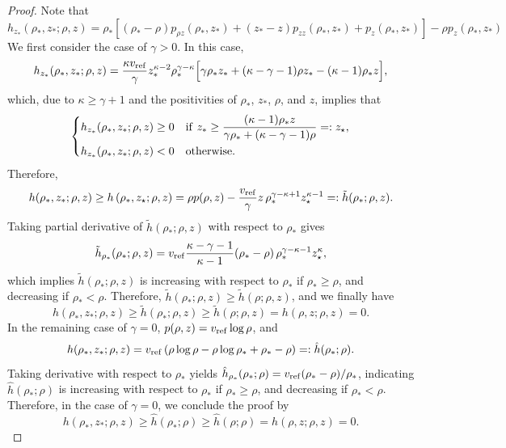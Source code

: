 \documentclass[times,final]{elsarticle}
\numberwithin{equation}{section}
\theoremstyle{definition}
\theoremstyle{remark}
\newcommand{\rz}{z_\star}
\begin{document}
\begin{proof}
	Note that
	\[
	h_{z_*}(\rho_*, z_*;\rho,z)
	= 
	\rho_*\left[
	\left(\rho_*-\rho\right) p_{\rho z}(\rho_*, z_*)
	+
	(z_*-z) p_{zz}(\rho_*, z_*)
	+
	p_z(\rho_*, z_*)
	\right]
	-\rho p_z(\rho_*, z_*) 
	\]
	We first consider the case of $\gamma > 0$. In this case,
	\[
	h_{z_*}(\rho_*, z_*;\rho,z)
	= 
	\frac{\kappa v_{\rm ref}}{\gamma} z_*^{\kappa-2} \rho_*^{\gamma-\kappa}
	\Big[
	\gamma \rho_*z_*
	+
	(\kappa-\gamma-1) \rho z_*
	-
	(\kappa-1) \rho_* z
	\Big],
	\]
	which, due to $\kappa \ge \gamma+1$ and the positivities of $\rho_*$, $z_*$, $\rho$, and $z$, implies that
	\[
	\begin{dcases}
		h_{z_*}(\rho_*, z_*;\rho,z) \ge 0
		&
		{\rm if} ~  z_* \ge \frac{(\kappa-1) \rho_* z}{\gamma \rho_* + (\kappa-\gamma-1) \rho} =: \rz,
		\\
		h_{z_*}(\rho_*, z_*;\rho,z) < 0
		&
		{\rm otherwise}.
	\end{dcases}
	\]
	Therefore,
	\begin{align*}
		h(\rho_*, z_*;\rho,z)
		\ge 
		h\left(\rho_*, \rz;\rho,z\right)
		= \rho p (\rho, z) - \frac{v_{\rm ref}}{\gamma} z \, \rho_*^{\gamma - \kappa + 1} \rz^{\kappa - 1}
		=:	\tilde{h}(\rho_*;\rho,z).
	\end{align*}
	Taking partial derivative of $\tilde{h}(\rho_*;\rho,z)$ with respect to $\rho_*$ gives
	\[
	\tilde h_{\rho_*}(\rho_*;\rho,z)
	=
	v_{\rm ref} \frac{\kappa - \gamma - 1}{\kappa - 1} 
	(\rho_* -\rho) \, \rho_* ^{\gamma -\kappa -1} \rz^\kappa,
	\]
	which implies $\tilde h(\rho_*;\rho,z)$ is increasing with respect to $\rho_*$ if $\rho_* \ge \rho$, and decreasing if $\rho_* < \rho$.
	Therefore, $\tilde h(\rho_*;\rho,z)	\ge \tilde h(\rho;\rho,z)$, and we finally have
	\[
	h(\rho_*,z_*;\rho,z) 
	\ge \tilde h(\rho_*;\rho,z)
	\ge \tilde h(\rho;\rho,z)
	=
	h(\rho,z;\rho,z) = 0.
	\]
	In the remaining case of $\gamma = 0$, $p(\rho,z) = v_{\rm ref} \log \rho$, and
	\[
	h(\rho_*,z_*;\rho,z)
	=
	v_{\rm ref} \left(
	\rho \log \rho - \rho \log \rho_* + \rho_* - \rho
	\right)
	=: \hat{h}(\rho_*;\rho).
	\]
	Taking derivative with respect to $\rho_*$ yields
	$\hat{h}_{\rho_*}(\rho_*;\rho)=v_{\rm ref}(\rho_*-\rho)/\rho_*$, indicating $\hat{h}(\rho_*;\rho)$ is increasing with respect to $\rho_*$ if $\rho_* \ge \rho$, and decreasing if $\rho_* < \rho$.
	Therefore, in the case of $\gamma = 0$, we conclude the proof by
	\[
	h(\rho_*,z_*;\rho,z) \ge \hat{h}(\rho_*;\rho) \ge \hat{h}(\rho;\rho) = h(\rho,z;\rho,z) = 0.
	\]
\end{proof}
\end{document}
